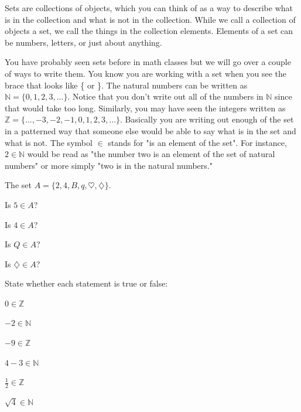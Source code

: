\begin{info}
Sets are collections of objects, which you can think of as a way to describe what is in the collection and what is not in the collection. While we call a collection of objects a set, we call the things in the collection elements. Elements of a set can be numbers, letters, or just about anything.

You have probably seen sets before in math classes but we will go over a couple of ways to write them. You know you are working with a set when you see the brace that looks like \{ or \}. The natural numbers can be written as $\mathbb{N} = \{0,1,2,3,... \}$. Notice that you don't write out all of the numbers in $\mathbb{N}$ since that would take too long. Similarly, you may have seen the integers written as $\mathbb{Z}=\{ ...,-3,-2,-1,0,1,2,3,... \}$. Basically you are writing out enough of the set in a patterned way that someone else would be able to say what is in the set and what is not. The symbol $\in$ stands for "is an element of the set". For instance, $ 2 \in \mathbb{N}$ would be read as "the number two is an element of the set of natural numbers" or more simply "two is in the natural numbers."
\end{info}
\bq The set $A=\{2,4,B,q,\heartsuit,\diamondsuit \}$.
\be
\item Is $5 \in A$?
\item Is $4 \in A$?
\item Is $Q \in A$?
\item Is $\diamondsuit \in A$?
\ee
\eq


\bq State whether each statement is true or false:
\be
\item $0 \in \mathbb{Z}$
\item $-2 \in \mathbb{N}$
\item $-9 \in \mathbb{Z}$
\item $4-3 \in \mathbb{N}$
\item $\frac{1}{2} \in \mathbb{Z}$
\item $\sqrt{4} \in \mathbb{N}$
\ee \eq

